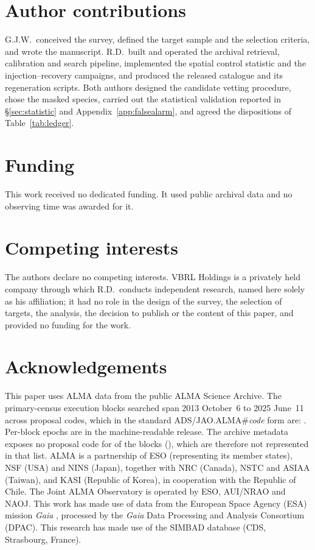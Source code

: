 \section*{Author contributions}
G.J.W.\ conceived the survey, defined the target sample and the selection
criteria, and wrote the manuscript. R.D.\ built and operated the archival
retrieval, calibration and search pipeline, implemented the spatial control
statistic and the injection--recovery campaigns, and produced the released
catalogue and its regeneration scripts. Both authors designed the candidate
vetting procedure, chose the masked species, carried out the statistical
validation reported in \S\ref{sec:statistic} and
Appendix~\ref{app:falsealarm}, and agreed the dispositions of
Table~\ref{tab:ledger}.

\section*{Funding}
This work received no dedicated funding. It used public archival data and
no observing time was awarded for it.

\section*{Competing interests}
The authors declare no competing interests. VBRL Holdings is a privately
held company through which R.D.\ conducts independent research, named
here solely as his affiliation; it had no role in the design of the
survey, the selection of targets, the analysis, the decision to publish
or the content of this paper, and provided no funding for the work.

\section*{Acknowledgements}
This paper uses ALMA data from the public ALMA Science Archive. The \NEB{}
primary-census execution blocks searched span 2013 October~6 to 2025
June~11 across \NProjCodes{} proposal codes, which in the standard
ADS/JAO.ALMA\#\textit{code} form are:
. Per-block epochs are in the machine-readable release. The
archive metadata exposes no proposal code for \NProjCodeUnres{} of the
\NEB{} blocks (\ProjCodeUnresList), which are therefore not represented in
that list. ALMA is a partnership of ESO
(representing its member states), NSF (USA) and NINS (Japan), together with NRC
(Canada), NSTC and ASIAA (Taiwan), and KASI (Republic of Korea), in cooperation
with the Republic of Chile. The Joint ALMA Observatory is operated by ESO,
AUI/NRAO and NAOJ. This work has made use of data from the European Space
Agency (ESA) mission {\it Gaia} \citep{GaiaDR3}, processed by the {\it Gaia}
Data Processing and Analysis Consortium (DPAC). This research has made use
of the SIMBAD database (CDS, Strasbourg, France).

